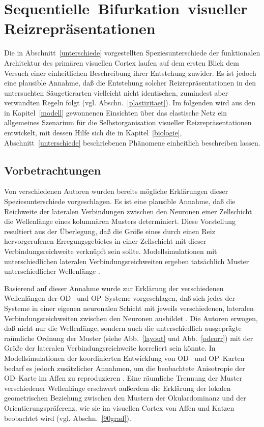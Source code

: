 \section{\mbox{Sequentielle}~\mbox{Bifurkation}~\mbox{visueller}~\mbox{Reizrepräsentationen}}
\label{main}
\thispagestyle{plain}

Die in Abschnitt~\ref{unterschiede} vorgestellten Speziesunterschiede der
funktionalen Architektur des primären visuellen Cortex laufen auf dem
ersten Blick dem Versuch einer einheitlichen Beschreibung ihrer Entstehung
zuwider. Es ist jedoch eine plausible Annahme, daß die Entstehung solcher
Reizrepräsentationen in den untersuchten Säugetierarten vielleicht nicht
identischen, zumindest aber verwandten Regeln folgt
(vgl. Abschn.~\ref{plastizitaet}). Im folgenden wird aus den in
Kapitel~\ref{modell} gewonnenen Einsichten über das elastische Netz ein
allgemeines Szenarium für die Selbstorganisation visueller
Reizrepräsentationen entwickelt, mit dessen Hilfe sich die in
Kapitel~\ref{biologie}, Abschnitt~\ref{unterschiede} beschriebenen
Phänomene einheitlich beschreiben lassen.

\subsection{Vorbetrachtungen}

Von verschiedenen Autoren wurden bereits mögliche Erklärungen dieser
Speziesunterschiede vorgeschlagen. Es ist eine plausible Annahme, daß die
Reichweite der lateralen Verbindungen zwischen den Neuronen einer
Zellschicht die Wellenlänge eines kolumnären Musters determiniert. Diese
Vorstellung resultiert aus der Überlegung, daß die Größe eines durch
einen Reiz hervorgerufenen Erregungsgebietes in einer Zellschicht mit
dieser Verbindungsreichweite verknüpft sein sollte. Modellsimulationen
mit unterschiedlichen lateralen Verbindungsreichweiten ergeben tatsächlich
Muster unterschiedlicher Wellenlänge \cite{swindale:1992}.

Basierend auf dieser Annahme wurde zur Erklärung der verschiedenen
Wellenlängen der OD-- und OP--Systeme vorgeschlagen, daß sich jedes der
Systeme in einer eigenen neuronalen Schicht mit jeweils verschiedenen,
lateralen Verbindungsreichweiten zwischen den Neuronen ausbildet
\cite{loewel:1988}. Die Autoren erwogen, daß nicht nur die Wellenlänge,
sondern auch die unterschiedlich ausgeprägte raümliche Ordnung der Muster
(siehe Abb.~\ref{layout} und Abb.~\ref{odcorr}) mit der Größe der
lateralen Verbindungsreichweite korreliert sein könnte. In
Modellsimulationen der koordinierten Entwicklung von OD-- und OP--Karten
bedarf es jedoch zusätzlicher Annahmen, um die beobachtete Anisotropie der
OD--Karte im Affen zu reproduzieren \cite{swindale:1992}. Eine räumliche
Trennung der Muster verschiedener Wellenlänge erschwert außerdem die
Erklärung der lokalen geometrischen Beziehung zwischen den Mustern der
Okulardominanz und der Orientierungspräferenz, wie sie im visuellen Cortex
von Affen und Katzen beobachtet wird (vgl. Abschn.~\ref{90grad}).


